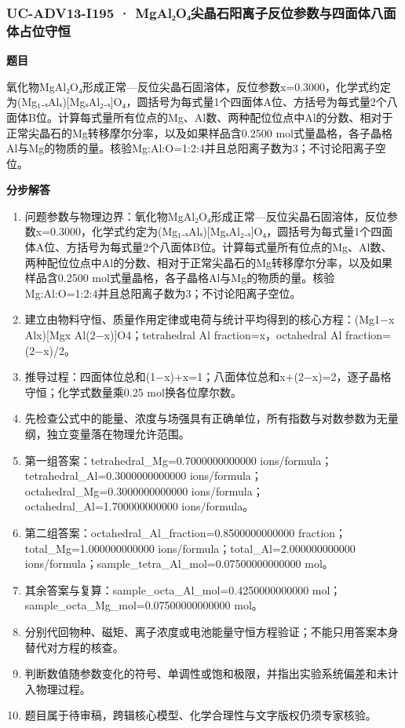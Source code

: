 \documentclass[UTF8,11pt,a4paper]{ctexart}
\begin{document}
\subsubsection*{UC-ADV13-I195 · MgAl₂O₄尖晶石阳离子反位参数与四面体八面体占位守恒}
\noindent\textbf{题目}\par
氧化物MgAl₂O₄形成正常—反位尖晶石固溶体，反位参数x=0.3000，化学式约定为(Mg₁₋ₓAlₓ)[MgₓAl₂₋ₓ]O₄，圆括号为每式量1个四面体A位、方括号为每式量2个八面体B位。计算每式量所有位点的Mg、Al数、两种配位位点中Al的分数、相对于正常尖晶石的Mg转移摩尔分率，以及如果样品含0.2500 mol式量晶格，各子晶格Al与Mg的物质的量。核验Mg:Al:O=1:2:4并且总阳离子数为3；不讨论阳离子空位。\par
\medskip\noindent\textbf{分步解答}
\begin{enumerate}
\item 问题参数与物理边界：氧化物MgAl₂O₄形成正常—反位尖晶石固溶体，反位参数x=0.3000，化学式约定为(Mg₁₋ₓAlₓ)[MgₓAl₂₋ₓ]O₄，圆括号为每式量1个四面体A位、方括号为每式量2个八面体B位。计算每式量所有位点的Mg、Al数、两种配位位点中Al的分数、相对于正常尖晶石的Mg转移摩尔分率，以及如果样品含0.2500 mol式量晶格，各子晶格Al与Mg的物质的量。核验Mg:Al:O=1:2:4并且总阳离子数为3；不讨论阳离子空位。
\item 建立由物料守恒、质量作用定律或电荷与统计平均得到的核心方程：(Mg1−x Alx)[Mgx Al(2−x)]O4；tetrahedral Al fraction=x，octahedral Al fraction=(2−x)/2。
\item 推导过程：四面体位总和(1−x)+x=1；八面体位总和x+(2−x)=2，逐子晶格守恒；化学式数量乘0.25 mol换各位摩尔数。
\item 先检查公式中的能量、浓度与场强具有正确单位，所有指数与对数参数为无量纲，独立变量落在物理允许范围。
\item 第一组答案：tetrahedral\_Mg=0.7000000000000 ions/formula；tetrahedral\_Al=0.3000000000000 ions/formula；octahedral\_Mg=0.3000000000000 ions/formula；octahedral\_Al=1.700000000000 ions/formula。
\item 第二组答案：octahedral\_Al\_fraction=0.8500000000000 fraction；total\_Mg=1.000000000000 ions/formula；total\_Al=2.000000000000 ions/formula；sample\_tetra\_Al\_mol=0.07500000000000 mol。
\item 其余答案与复算：sample\_octa\_Al\_mol=0.4250000000000 mol；sample\_octa\_Mg\_mol=0.07500000000000 mol。
\item 分别代回物种、磁矩、离子浓度或电池能量守恒方程验证；不能只用答案本身替代对方程的核查。
\item 判断数值随参数变化的符号、单调性或饱和极限，并指出实验系统偏差和未计入物理过程。
\item 题目属于待审稿，跨辑核心模型、化学合理性与文字版权仍须专家核验。
\end{enumerate}
\end{document}
